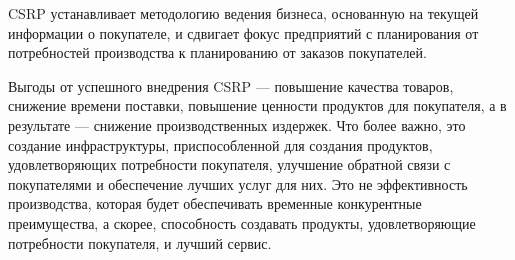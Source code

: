 CSRP устанавливает методологию ведения бизнеса, основанную на текущей информации о покупателе, и сдвигает фокус предприятий с планирования от потребностей производства к планированию от заказов покупателей.

Выгоды от успешного внедрения CSRP --- повышение качества товаров, снижение времени поставки, повышение ценности продуктов для покупателя, а в результате --- снижение производственных издержек.
Что более важно, это создание инфраструктуры, приспособленной для создания продуктов, удовлетворяющих потребности покупателя, улучшение обратной связи с покупателями и обеспечение лучших услуг для них.
Это не эффективность производства, которая будет обеспечивать временные конкурентные преимущества, а скорее, способность создавать продукты, удовлетворяющие потребности покупателя, и лучший сервис.






